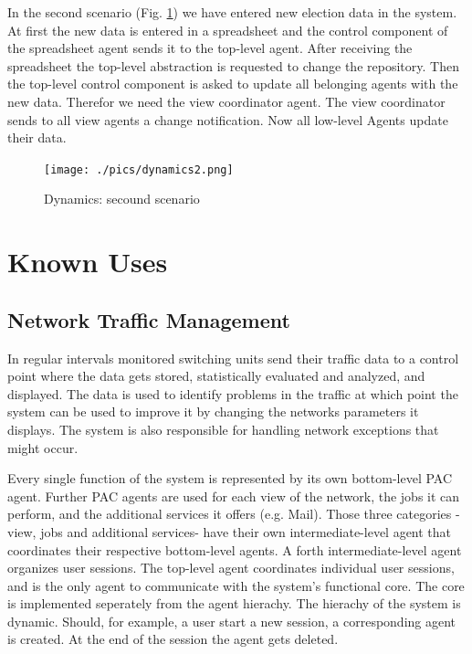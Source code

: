 \documentclass{scrbook}
\begin{document}
In the second scenario (Fig. \ref{abb:dyn2}) we have entered new election data in the system.  At first the new data is entered in a spreadsheet and the control component of the spreadsheet agent sends it to the top-level agent. After receiving the spreadsheet the top-level abstraction is requested to change the repository. Then the top-level control component is asked to update all belonging agents with the new data. Therefor we need the view coordinator agent. The view coordinator sends to all view agents a change notification. Now all low-level Agents update their data.  

\begin{figure}
 \centering
 \texttt{[image: ./pics/dynamics2.png]}
 \caption[Cap]{Dynamics: secound scenario\endnotemark[1]}
 \label{abb:dyn2}
\end{figure}



\section{Known Uses}

\subsection{Network Traffic Management}
In regular intervals monitored switching units send their traffic data to a control point where the data gets
stored, statistically evaluated and analyzed, and displayed. The data is used to identify problems in the traffic
at which point the system can be used to improve it by changing the networks parameters it displays. The
system is also responsible for handling network exceptions that might occur.

Every single function of the system is represented by its own bottom-level PAC agent. Further PAC agents are
used for each view of the network, the jobs it can perform, and the additional services it offers (e.g. Mail).
Those three categories -view, jobs and additional services- have their own intermediate-level agent that
coordinates their respective bottom-level agents. A forth intermediate-level agent organizes user sessions.
The top-level agent coordinates individual user sessions, and is the only agent to communicate with the
system's functional core. The core is implemented seperately from the agent hierachy.
The hierachy of the system is dynamic. Should, for example, a user start a new session, a corresponding agent
is created. At the end of the session the agent gets deleted.
\end{document}
